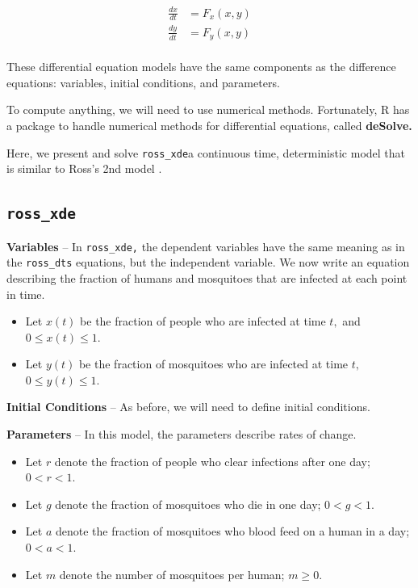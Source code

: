 \documentclass[
]{book}
\begin{document}
\[
\begin{array}{rl}
\frac{\textstyle{dx}}{\textstyle{dt}} &=  F_x (x, y)  \\ 
\frac{\textstyle{dy}}{\textstyle{dt}} &=  F_y (x, y) \\ 
\end{array}
\]

These differential equation models have the same components as the difference equations: variables, initial conditions, and parameters.

To compute anything, we will need to use numerical methods. Fortunately, R has a package to handle numerical methods for differential equations, called \textbf{deSolve.}

Here, we present and solve \texttt{ross\_xde}a continuous time, deterministic model that is similar to Ross's 2nd model \autocite{RossR1911Nature}.

\subsection{\texorpdfstring{\texttt{ross\_xde}}{ross\_xde}}\label{ross_xde}

\textbf{Variables} -- In \texttt{ross\_xde,} the dependent variables have the same meaning as in the \texttt{ross\_dts} equations, but the independent variable. We now write an equation describing the fraction of humans and mosquitoes that are infected at each point in time.

\begin{itemize}
\item
  Let \(x(t)\) be the fraction of people who are infected at time \(t,\) and \(0 \leq x(t) \leq 1.\)
\item
  Let \(y(t)\) be the fraction of mosquitoes who are infected at time \(t,\) \(0 \leq y(t) \leq 1.\)
\end{itemize}

\textbf{Initial Conditions} -- As before, we will need to define initial conditions.

\textbf{Parameters} -- In this model, the parameters describe rates of change.

\begin{itemize}
\item
  Let \(r\) denote the fraction of people who clear infections after one day; \(0 < r < 1.\)
\item
  Let \(g\) denote the fraction of mosquitoes who die in one day; \(0 < g < 1.\)
\item
  Let \(a\) denote the fraction of mosquitoes who blood feed on a human in a day; \(0 < a < 1.\)
\item
  Let \(m\) denote the number of mosquitoes per human; \(m \geq 0.\)
\end{itemize}
\end{document}
